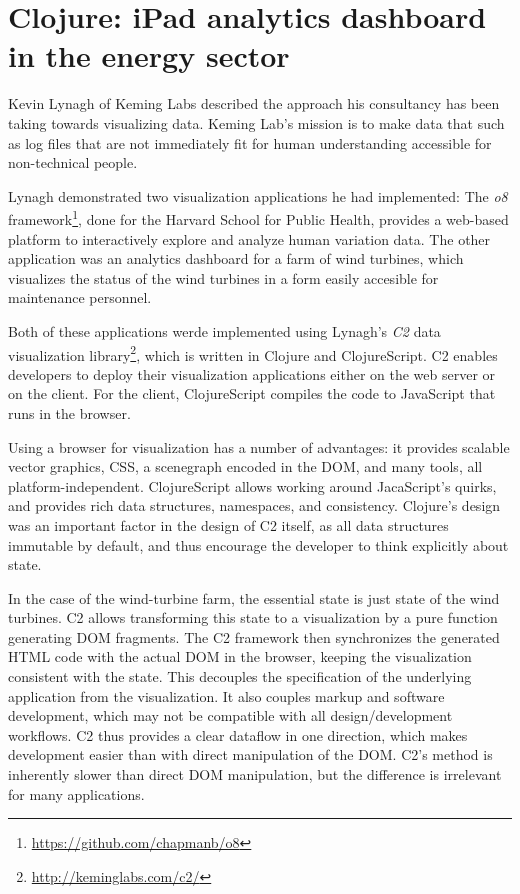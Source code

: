\documentclass{jfp1}
\begin{document}
\section{Clojure: iPad analytics dashboard in the energy sector}

Kevin Lynagh of Keming Labs described the approach his consultancy has
been taking towards visualizing data.  Keming Lab's mission is to make
data that such as log files that are not immediately fit for human
understanding accessible for non-technical people.  

Lynagh demonstrated two visualization applications he had implemented:
The \textit{o8}
framework\footnote{\url{https://github.com/chapmanb/o8}}, done for the
Harvard School for Public Health, provides a web-based platform to
interactively explore and analyze human variation data.  The other
application was an analytics dashboard for a farm of wind turbines,
which visualizes the status of the wind turbines in a form easily
accesible for maintenance personnel.

Both of these applications werde implemented using Lynagh's
\textit{C2} data visualization
library\footnote{\url{http://keminglabs.com/c2/}}, which is written in
Clojure and ClojureScript.  C2 enables developers to deploy their
visualization applications either on the web server or on the client.
For the client, ClojureScript compiles the code to JavaScript that
runs in the browser.

Using a browser for visualization has a number of advantages: it
provides scalable vector graphics, CSS, a scenegraph encoded in the
DOM, and many tools, all platform-independent.  ClojureScript allows
working around JacaScript's quirks, and provides rich data structures,
namespaces, and consistency.  Clojure's design was an important factor
in the design of C2 itself, as all data structures immutable by
default, and thus encourage the developer to think explicitly about
state.

In the case of the wind-turbine farm, the essential state is just
state of the wind turbines.  C2 allows transforming this state to a
visualization by a pure function generating DOM fragments.  The C2
framework then synchronizes the generated HTML code with the actual
DOM in the browser, keeping the visualization consistent with the
state.  This decouples the specification of the underlying application
from the visualization.  It also couples markup and software
development, which may not be compatible with all design/development
workflows.  C2 thus provides a clear dataflow in one direction, which
makes development easier than with direct manipulation of the DOM.
C2's method is inherently slower than direct DOM manipulation, but the
difference is irrelevant for many applications.
\end{document}
